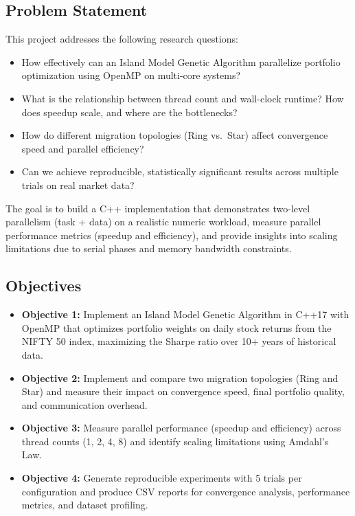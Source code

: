 \documentclass[12pt,a4paper]{article}
\begin{document}
\subsection{Problem Statement}

This project addresses the following research questions:

\begin{itemize}
	\item How effectively can an Island Model Genetic Algorithm parallelize portfolio optimization using OpenMP on multi-core systems?
	\item What is the relationship between thread count and wall-clock runtime? How does speedup scale, and where are the bottlenecks?
	\item How do different migration topologies (Ring vs.~Star) affect convergence speed and parallel efficiency?
	\item Can we achieve reproducible, statistically significant results across multiple trials on real market data?
\end{itemize}

The goal is to build a C++ implementation that demonstrates two-level parallelism (task + data) on a realistic numeric workload, measure parallel performance metrics (speedup and efficiency), and provide insights into scaling limitations due to serial phases and memory bandwidth constraints.

\subsection{Objectives}

\begin{itemize}
	\item \textbf{Objective 1:} Implement an Island Model Genetic Algorithm in C++17 with OpenMP that optimizes portfolio weights on daily stock returns from the NIFTY 50 index, maximizing the Sharpe ratio over 10+ years of historical data.
	
	\item \textbf{Objective 2:} Implement and compare two migration topologies (Ring and Star) and measure their impact on convergence speed, final portfolio quality, and communication overhead.
	
	\item \textbf{Objective 3:} Measure parallel performance (speedup and efficiency) across thread counts (1, 2, 4, 8) and identify scaling limitations using Amdahl's Law.
	
	\item \textbf{Objective 4:} Generate reproducible experiments with 5 trials per configuration and produce CSV reports for convergence analysis, performance metrics, and dataset profiling.
\end{itemize}
\end{document}
